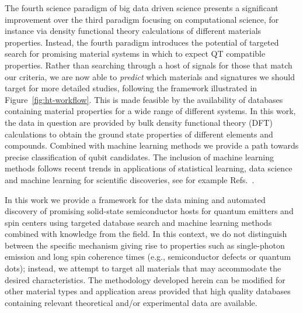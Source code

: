 \documentclass[superscriptaddress,unsortedaddress,
 amsmath,amssymb,
 aps,
]{revtex4-2}
\begin{document}
The fourth science paradigm of big data driven science presents a significant improvement over the third paradigm focusing on computational science, for instance via density functional theory calculations of different materials properties. Instead, the fourth paradigm introduces the potential of targeted search for promising material systems in which to expect QT compatible properties. 
Rather than searching through a host of signals for those that match our criteria, we are now able to \textit{predict} which materials and signatures we should target for more detailed studies, following the framework illustrated in Figure~\ref{fig:ht-workflow}. 
This is made feasible by the availability of databases containing material properties for a wide range of different systems. In this work, the data in question are provided by bulk density functional theory (DFT) calculations to obtain the ground state properties of different elements and compounds. Combined with machine learning methods we provide a path towards precise classification of qubit candidates. The inclusion of machine learning methods follows recent trends in applications of statistical learning, data science and machine learning for scientific discoveries, see for example Refs.~\cite{deiana2021,Carleo2019}. 

In this work we provide a framework for the data mining and automated discovery of promising solid-state semiconductor hosts for quantum emitters and spin centers using targeted database search and machine learning methods combined with knowledge from the field. 
In this context, we do not distinguish between the specific mechanism giving rise to properties such as single-photon emission and long spin coherence times (e.g., semiconductor defects or quantum dots); instead, we attempt to target all materials that may accommodate the desired characteristics.  
The methodology developed herein can be modified for other material types and application areas provided that high quality databases containing relevant theoretical and/or experimental data are available. 
\end{document}
